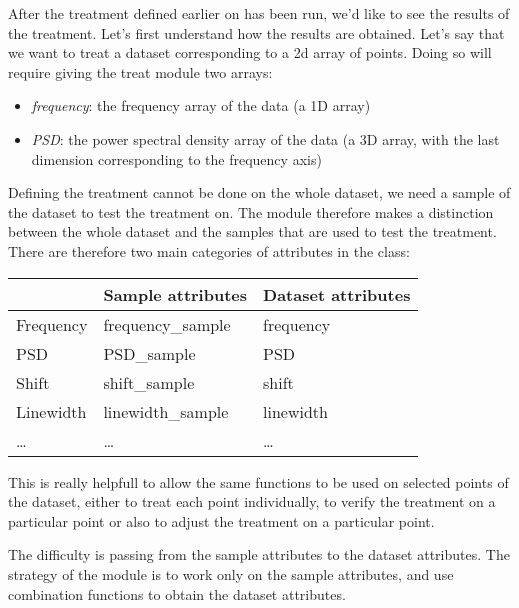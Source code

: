 After the treatment defined earlier on has been run, we'd like to see the results of the treatment. Let's first understand how the results are obtained. Let's say that we want to treat a dataset corresponding to a 2d array of points. Doing so will require giving the treat module two arrays:
\begin{itemize}
    \item \textit{frequency}: the frequency array of the data (a 1D array)
    \item \textit{PSD}: the power spectral density array of the data (a 3D array, with the last dimension corresponding to the frequency axis)
\end{itemize}

Defining the treatment cannot be done on the whole dataset, we need a sample of the dataset to test the treatment on. The module therefore makes a distinction between the whole dataset and the samples that are used to test the treatment. There are therefore two main categories of attributes in the class:
\begin{table}[h!]
    \centering
    \begin{tabular}{|l|l|l|}
        \hline
        \textbf{} & 
        \textbf{Sample attributes} & 
        \textbf{Dataset attributes} \\
        \hline
        Frequency     & frequency\_sample                     & frequency \\
        PSD           & PSD\_sample                           & PSD \\
        Shift         & shift\_sample                         & shift \\
        Linewidth     & linewidth\_sample                     & linewidth \\
        \dots         & \dots                                 & \dots\\
        \hline
    \end{tabular}
\end{table}

This is really helpfull to allow the same functions to be used on selected points of the dataset, either to treat each point individually, to verify the treatment on a particular point or also to adjust the treatment on a particular point.

The difficulty is passing from the sample attributes to the dataset attributes. The strategy of the module is to work only on the sample attributes, and use combination functions to obtain the dataset attributes. 